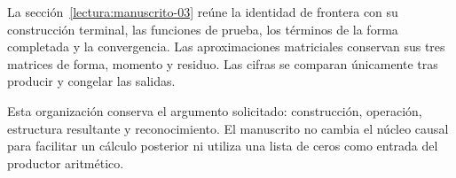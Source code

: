 La sección~\ref{lectura:manuscrito-03} reúne la identidad de frontera con su construcción terminal, las funciones de prueba, los términos de la forma completada y la convergencia. Las aproximaciones matriciales conservan sus tres matrices de forma, momento y residuo. Las cifras se comparan únicamente tras producir y congelar las salidas.

Esta organización conserva el argumento solicitado: construcción, operación, estructura resultante y reconocimiento. El manuscrito no cambia el núcleo causal para facilitar un cálculo posterior ni utiliza una lista de ceros como entrada del productor aritmético.
